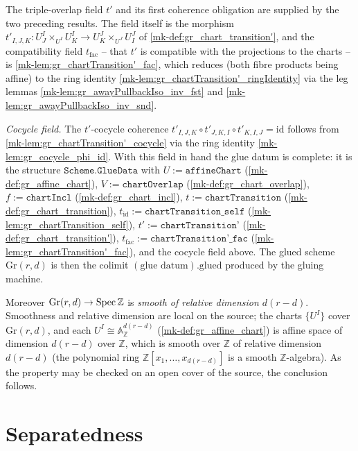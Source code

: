 \begin{definition}
  The triple-overlap field \(t'\) and its first coherence obligation are supplied
  by the two preceding results. The field itself is the morphism
  \(t'_{I,J,K} : U^I_J \times_{U^I} U^I_K \to U^J_K \times_{U^J} U^J_I\) of
  \ref{mk-def:gr_chart_transition'}, and the compatibility field
  \(t_{\mathrm{fac}}\) -- that \(t'\) is compatible with the projections to the
  charts -- is \ref{mk-lem:gr_chartTransition'_fac}, which reduces (both fibre
  products being affine) to the ring identity
  \ref{mk-lem:gr_chartTransition'_ringIdentity} via the leg lemmas
  \ref{mk-lem:gr_awayPullbackIso_inv_fst} and \ref{mk-lem:gr_awayPullbackIso_inv_snd}.

  \emph{Cocycle field.} The \(t'\)-cocycle coherence
  \(t'_{I,J,K} \circ t'_{J,K,I} \circ t'_{K,I,J} = \mathrm{id}\)
  follows from \ref{mk-lem:gr_chartTransition'_cocycle} via the ring identity
  \ref{mk-lem:gr_cocycle_phi_id}. With this field in hand the glue datum is
  complete: it is the structure \(\mathtt{Scheme.GlueData}\) with
  \(U := \texttt{affineChart}\) (\ref{mk-def:gr_affine_chart}),
  \(V := \texttt{chartOverlap}\) (\ref{mk-def:gr_chart_overlap}),
  \(f := \texttt{chartIncl}\) (\ref{mk-def:gr_chart_incl}),
  \(t := \texttt{chartTransition}\) (\ref{mk-def:gr_chart_transition}),
  \(t_{\mathrm{id}} := \texttt{chartTransition\_self}\)
  (\ref{mk-lem:gr_chartTransition_self}),
  \(t' := \texttt{chartTransition'}\) (\ref{mk-def:gr_chart_transition'}),
  \(t_{\mathrm{fac}} := \texttt{chartTransition'\_fac}\)
  (\ref{mk-lem:gr_chartTransition'_fac}), and the cocycle field above. The glued
  scheme \(\mathrm{Gr}(r,d)\) is then the colimit
  \((\text{glue datum}).\mathrm{glued}\) produced by the gluing machine.

  Moreover \(\mathrm{Gr}(r,d) \to \operatorname{Spec} \mathbb{Z}\) is \emph{smooth of relative
  dimension \(d(r-d)\)}. Smoothness and relative dimension are local on the
  source; the charts \(\{U^I\}\) cover \(\mathrm{Gr}(r,d)\), and each
  \(U^I \cong \mathbb{A}^{d(r-d)}_{\mathbb{Z}}\) (\ref{mk-def:gr_affine_chart}) is
  affine space of dimension \(d(r-d)\) over \(\mathbb{Z}\), which is smooth over
  \(\mathbb{Z}\) of relative dimension \(d(r-d)\) (the polynomial ring
  \(\mathbb{Z}[x_1, \dots, x_{d(r-d)}]\) is a smooth \(\mathbb{Z}\)-algebra). As
  the property may be checked on an open cover of the source, the conclusion
  follows.
\end{definition}

\section{Separatedness}
\label{mk-sec:gr_separated}

